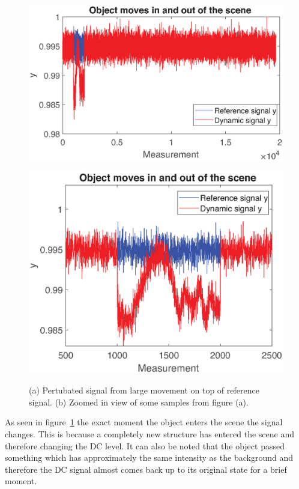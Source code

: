 \begin{figure}[H]
    \centering
\begin{minipage}[t]{0.53\textwidth}
    \includegraphics[width=1\textwidth]{result/dynamic/fly/flyby_sig1.eps}
    \subcaption{}
    \label{fig:fly_sig_1}
\end{minipage}
\begin{minipage}[t]{0.46\textwidth}
    \includegraphics[width = \textwidth]{result/dynamic/fly/flyby_plot_win1.eps}
    \subcaption{}
    \label{fig:fly_sig_2}
\end{minipage}
    \caption{(a) Pertubated signal from large movement on top of reference signal. (b) Zoomed in view of some samples from figure (a).}
    \label{fig:fly_sig}
\end{figure}

As seen in figure~\ref{fig:fly_sig} the exact moment the object enters the scene the signal changes. This is because a completely new structure has entered the scene and therefore changing the DC level. It can also be noted that the object passed something which has approximately the same intensity as the background and therefore the DC signal almost comes back up to its original state for a brief moment.\\[0.1in] 

